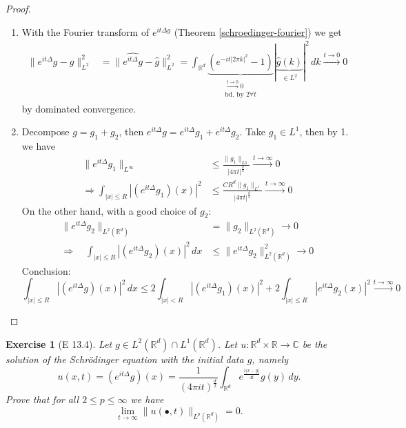 \documentclass{report}
\theoremstyle{tommy}
\newtheorem{ex}[defn]{Exercise}
\begin{document}
  \begin{proof}
    \begin{enumerate}
      \item With the Fourier transform of \(e^{it \Delta g}\) (Theorem \ref{schroedinger-fourier}) we get \begin{align*}
        \|e^{it \Delta} g - g\|_{L^2}^2 &= \|\widehat{e^{it\Delta}g} - \hat g\|_{L^2}^2 = \int_{\mathbb{R}^d} \underbrace{(e^{-it |2 \pi k|^2}-1)}_{\substack{\xrightarrow{t \to 0} 0 \\\text{bd. by } 2 \forall t}}|\underbrace{\hat g(k)}_{\in L^2}|^2 \, dk \xrightarrow{t \to 0}0
      \end{align*}
      by dominated convergence.
      \item Decompose \(g = g_1 + g_2\), then \(e^{it \Delta} g = e^{it\Delta} g_1 + e^{it \Delta} g_2\). Take \(g_1 \in L^1\), then by 1. we have
      \begin{align*}
        \|e^{it \Delta} g_1 \|_{L^\infty} &\le \frac{\|g_1\|_{L1}}{|4 \pi t|^{\frac{d}{2}}} \xrightarrow{t \to \infty} 0 \\
        \Rightarrow \int_{|x|\le R} |(e^{it \Delta}g_1) (x)|^2 &\le \frac{C R^d \|g_1\|_{L^1}}{|4 \pi t|^{\frac{d}{2}}} \xrightarrow{t \to \infty} 0
      \end{align*}
      On the other hand, with a good choice of \(g_2\):
      \begin{align*}
        \|e^{it\Delta} g_2 \|_{L^2(\mathbb{R}^d)} &= \|g_2\|_{L^2(\mathbb{R}^d)} \to 0 \\
        \Rightarrow \quad \int_{|x| \le R}|(e^{it \Delta} g_2)(x)|^2 \, dx &\le \|e^{it \Delta} g_2\|_{L^2(\mathbb{R}^d)}^2 \to 0
      \end{align*}
      Conclusion:
      \[\int_{|x|\le R}|(e^{it \Delta} g)(x)|^2 \, dx \le 2 \int_{|x|<R}|(e^{it \Delta}g_1)(x)|^2 + 2 \int_{|x| \le R} |e^{it \Delta} g_2(x)|^2 \xrightarrow{t \to \infty} 0\]
    \end{enumerate}
  \end{proof}

  \begin{ex}[E 13.4]\label{E 13.4}
    Let \(g \in L^2(\mathbb{R}^d) \cap L^1(\mathbb{R}^d)\). Let \(u: \mathbb{R}^d \times \mathbb{R} \to \mathbb{C}\) be the solution of the Schrödinger equation with the initial data \(g\), namely 
    \[u(x,t) = (e^{it \Delta} g)(x) = \frac{1}{(4 \pi it)^{\frac{d}{2}}} \int_{\mathbb{R}^d} e^{\frac{i |x-y|}{4t}} g(y) \, dy.\]
    Prove that for all \(2 \le p \le \infty\) we have 
    \[\lim_{t \to \infty} \|u(\bullet, t)\|_{L^p(\mathbb{R}^d)} = 0.\]
  \end{ex}
\end{document}
